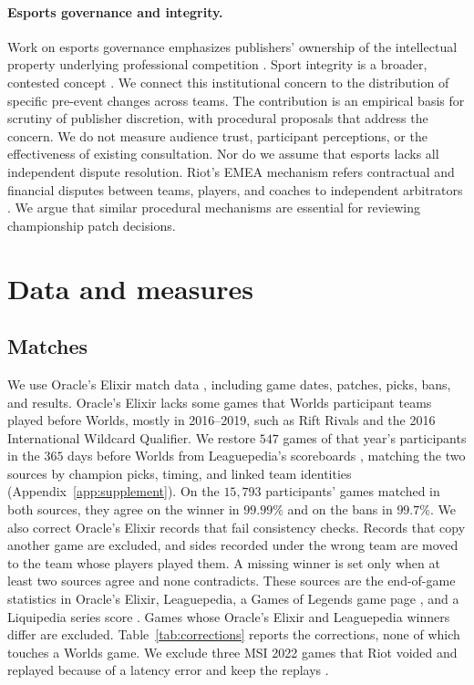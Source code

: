 \documentclass[11pt]{article}
\begin{document}
\paragraph{Esports governance and integrity.} Work on esports governance emphasizes publishers' ownership of the intellectual property underlying professional competition \citep{karhulahti2017,holden2017}. Sport integrity is a broader, contested concept \citep{gardiner2017}. We connect this institutional concern to the distribution of specific pre-event changes across teams. The contribution is an empirical basis for scrutiny of publisher discretion, with procedural proposals that address the concern. We do not measure audience trust, participant perceptions, or the effectiveness of existing consultation. Nor do we assume that esports lacks all independent dispute resolution. Riot's EMEA mechanism refers contractual and financial disputes between teams, players, and coaches to independent arbitrators \citep{riot2024disputes}. We argue that similar procedural mechanisms are essential for reviewing championship patch decisions.

\section{Data and measures}
\label{sec:data}

\subsection{Matches}
We use Oracle's Elixir match data \citep{oracleselixir}, including game dates, patches, picks, bans, and results. Oracle's Elixir lacks some games that Worlds participant teams played before Worlds, mostly in 2016--2019, such as Rift Rivals and the 2016 International Wildcard Qualifier. We restore $547$ games of that year's participants in the $365$ days before Worlds from Leaguepedia's scoreboards \citep{leaguepedia}, matching the two sources by champion picks, timing, and linked team identities (Appendix~\ref{app:supplement}). On the $15{,}793$ participants' games matched in both sources, they agree on the winner in $99.99\%$ and on the bans in $99.7\%$. We also correct Oracle's Elixir records that fail consistency checks. Records that copy another game are excluded, and sides recorded under the wrong team are moved to the team whose players played them. A missing winner is set only when at least two sources agree and none contradicts. These sources are the end-of-game statistics in Oracle's Elixir, Leaguepedia, a Games of Legends game page \citeyearpar{golgg}, and a Liquipedia series score \citeyearpar{liquipedia}. Games whose Oracle's Elixir and Leaguepedia winners differ are excluded. Table~\ref{tab:corrections} reports the corrections, none of which touches a Worlds game. We exclude three MSI 2022 games that Riot voided and replayed because of a latency error and keep the replays \citep{riot2022latency}.
\end{document}
